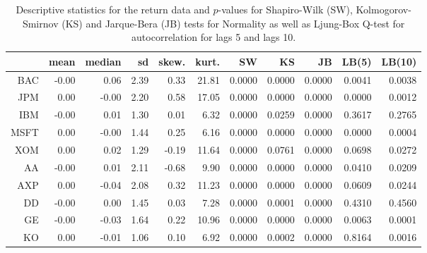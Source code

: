 \begin{table}[ht]
\centering
\begin{tabular}{rrrrrrrrrrr}
  \hline
 & mean & median & sd & skew. & kurt. & SW & KS & JB & LB(5) & LB(10) \\ 
  \hline
BAC & -0.00 & 0.06 & 2.39 & 0.33 & 21.81 & 0.0000 & 0.0000 & 0.0000 & 0.0041 & 0.0038 \\ 
  JPM & 0.00 & -0.00 & 2.20 & 0.58 & 17.05 & 0.0000 & 0.0000 & 0.0000 & 0.0000 & 0.0012 \\ 
  IBM & -0.00 & 0.01 & 1.30 & 0.01 & 6.32 & 0.0000 & 0.0259 & 0.0000 & 0.3617 & 0.2765 \\ 
  MSFT & 0.00 & -0.00 & 1.44 & 0.25 & 6.16 & 0.0000 & 0.0000 & 0.0000 & 0.0000 & 0.0004 \\ 
  XOM & 0.00 & 0.02 & 1.29 & -0.19 & 11.64 & 0.0000 & 0.0761 & 0.0000 & 0.0698 & 0.0272 \\ 
  AA & -0.00 & 0.01 & 2.11 & -0.68 & 9.90 & 0.0000 & 0.0000 & 0.0000 & 0.0410 & 0.0209 \\ 
  AXP & 0.00 & -0.04 & 2.08 & 0.32 & 11.23 & 0.0000 & 0.0000 & 0.0000 & 0.0609 & 0.0244 \\ 
  DD & -0.00 & 0.00 & 1.45 & 0.03 & 7.28 & 0.0000 & 0.0001 & 0.0000 & 0.4310 & 0.4560 \\ 
  GE & -0.00 & -0.03 & 1.64 & 0.22 & 10.96 & 0.0000 & 0.0000 & 0.0000 & 0.0063 & 0.0001 \\ 
  KO & 0.00 & -0.01 & 1.06 & 0.10 & 6.92 & 0.0000 & 0.0002 & 0.0000 & 0.8164 & 0.0016 \\ 
   \hline
\end{tabular}
\caption{Descriptive statistics for the return data and
              $p$-values for  Shapiro-Wilk (SW), Kolmogorov-Smirnov (KS) and 
             Jarque-Bera (JB) tests for Normality as well as Ljung-Box Q-test
             for autocorrelation for lags 5 and lags 10.} 
\label{table:rets_desc}
\end{table}
